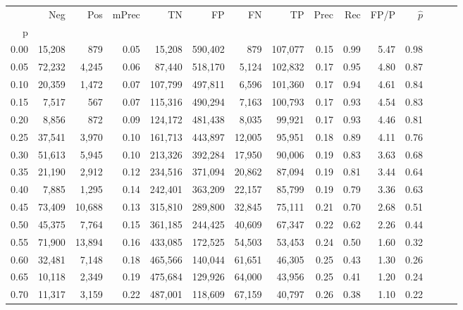 \begin{tabular}{rrrrrrrrrrrrrrr}
\toprule
{} &     Neg &     Pos & mPrec &       TN &       FP &       FN &       TP &  Prec &   Rec &  FP/P & $\hat{p}$ \\
p    &         &         &       &          &          &          &          &       &       &       &           \\
\midrule
0.00 &  15,208 &     879 &  0.05 &   15,208 &  590,402 &      879 &  107,077 &  0.15 &  0.99 &  5.47 &      0.98 \\
0.05 &  72,232 &   4,245 &  0.06 &   87,440 &  518,170 &    5,124 &  102,832 &  0.17 &  0.95 &  4.80 &      0.87 \\
0.10 &  20,359 &   1,472 &  0.07 &  107,799 &  497,811 &    6,596 &  101,360 &  0.17 &  0.94 &  4.61 &      0.84 \\
0.15 &   7,517 &     567 &  0.07 &  115,316 &  490,294 &    7,163 &  100,793 &  0.17 &  0.93 &  4.54 &      0.83 \\
0.20 &   8,856 &     872 &  0.09 &  124,172 &  481,438 &    8,035 &   99,921 &  0.17 &  0.93 &  4.46 &      0.81 \\
0.25 &  37,541 &   3,970 &  0.10 &  161,713 &  443,897 &   12,005 &   95,951 &  0.18 &  0.89 &  4.11 &      0.76 \\
0.30 &  51,613 &   5,945 &  0.10 &  213,326 &  392,284 &   17,950 &   90,006 &  0.19 &  0.83 &  3.63 &      0.68 \\
0.35 &  21,190 &   2,912 &  0.12 &  234,516 &  371,094 &   20,862 &   87,094 &  0.19 &  0.81 &  3.44 &      0.64 \\
0.40 &   7,885 &   1,295 &  0.14 &  242,401 &  363,209 &   22,157 &   85,799 &  0.19 &  0.79 &  3.36 &      0.63 \\
0.45 &  73,409 &  10,688 &  0.13 &  315,810 &  289,800 &   32,845 &   75,111 &  0.21 &  0.70 &  2.68 &      0.51 \\
0.50 &  45,375 &   7,764 &  0.15 &  361,185 &  244,425 &   40,609 &   67,347 &  0.22 &  0.62 &  2.26 &      0.44 \\
0.55 &  71,900 &  13,894 &  0.16 &  433,085 &  172,525 &   54,503 &   53,453 &  0.24 &  0.50 &  1.60 &      0.32 \\
0.60 &  32,481 &   7,148 &  0.18 &  465,566 &  140,044 &   61,651 &   46,305 &  0.25 &  0.43 &  1.30 &      0.26 \\
0.65 &  10,118 &   2,349 &  0.19 &  475,684 &  129,926 &   64,000 &   43,956 &  0.25 &  0.41 &  1.20 &      0.24 \\
0.70 &  11,317 &   3,159 &  0.22 &  487,001 &  118,609 &   67,159 &   40,797 &  0.26 &  0.38 &  1.10 &      0.22 \\

\end{tabular}
